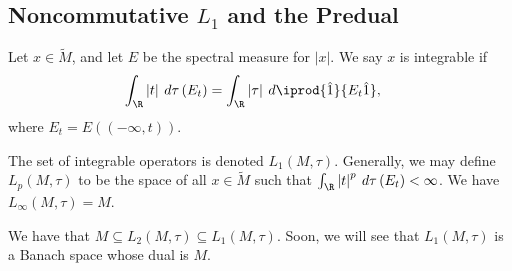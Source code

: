 \documentclass[10pt]{mypackage}
\begin{document}
\subsection{Noncommutative $L_1$ and the Predual}%
\begin{definition}
  Let $x\in \widetilde{M}$, and let $E$ be the spectral measure for $\left\vert x \right\vert$. We say $x$ is integrable if
  \begin{align*}
    \int_{\R}^{} \left\vert t \right\vert\:d\tau\left( E_t \right) &= \int_{\R}^{} \left\vert \tau \right\vert\:d \iprod{\hat{1}}{E_t\hat{1}},
  \end{align*}
  where $E_t = E\left( \left( -\infty,t \right) \right)$.
\end{definition}
The set of integrable operators is denoted $L_1\left( M,\tau \right)$. Generally, we may define $L_p\left( M,\tau \right)$ to be the space of all $x\in \widetilde{M}$ such that $ \int_{\R}^{} \left\vert t \right\vert^{p}\:d\tau\left( E_t \right) < \infty $. We have $L_{\infty}\left( M,\tau \right) = M$.

We have that $M\subseteq L_2\left( M,\tau \right)\subseteq L_1\left( M,\tau \right)$. Soon, we will see that $L_1\left( M,\tau \right)$ is a Banach space whose dual is $M$.
\end{document}
